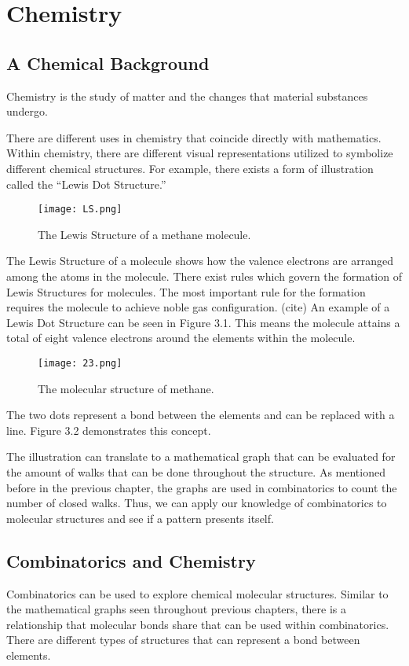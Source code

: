 \chapter{Chemistry}
\section{A Chemical Background}
\begin{definition}
    Chemistry is the study of matter and the changes that material substances undergo.
\end{definition}

There are different uses in chemistry that coincide directly with mathematics. Within chemistry, there are different visual representations utilized to symbolize different chemical structures. For example, there exists a form of illustration called the ``Lewis Dot Structure.''
\begin{figure}[h]
         \centering
         \texttt{[image: LS.png]}
         \caption{\small{The Lewis Structure of a methane molecule.}}
  \end{figure}

The Lewis Structure of a molecule shows how the valence electrons are arranged among the atoms in the molecule. There exist rules which govern the formation of Lewis Structures for molecules.  The most important rule for the formation requires the molecule to achieve noble gas configuration. {\color{red}(cite)} An example of a Lewis Dot Structure can be seen in Figure 3.1. This means the molecule attains a total of eight valence electrons around the elements within the molecule. 
 \begin{figure}[h]
         \centering
         \texttt{[image: 23.png]}
         \caption{\small{The molecular structure of methane.}}
 \end{figure}
\par The two dots represent a bond between the elements and can be replaced with a line. Figure 3.2 demonstrates this concept. 
\par The illustration can translate to a mathematical graph that can be evaluated for the amount of walks that can be done throughout the structure. As mentioned before in the previous chapter, the graphs are used in combinatorics to count the number of closed walks.  Thus, we can apply our knowledge of combinatorics to molecular structures and see if a pattern presents itself. 

\section{Combinatorics and Chemistry}
Combinatorics can be used to explore chemical molecular structures.  Similar to the mathematical graphs seen throughout previous chapters, there is a relationship that molecular bonds share that can be used within combinatorics.  There are different types of structures that can represent a bond between elements.  
